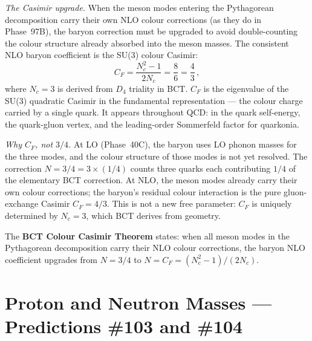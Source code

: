 \documentclass[10pt,twocolumn]{article}
\begin{document}
\textit{The Casimir upgrade.} When the meson modes entering the Pythagorean decomposition carry
their own NLO colour corrections (as they do in Phase~97B), the baryon correction must be
upgraded to avoid double-counting the colour structure already absorbed into the meson masses.
The consistent NLO baryon coefficient is the SU(3) colour Casimir:
\begin{equation}
C_F = \frac{N_c^2-1}{2N_c} = \frac{8}{6} = \frac{4}{3}\,,
\label{eq:CF}
\end{equation}
where $N_c = 3$ is derived from $D_4$ triality in BCT. $C_F$ is the eigenvalue of the SU(3)
quadratic Casimir in the fundamental representation --- the colour charge carried by a single
quark. It appears throughout QCD: in the quark self-energy, the quark-gluon vertex, and the
leading-order Sommerfeld factor for quarkonia.

\textit{Why $C_F$, not $3/4$.} At LO (Phase~40C), the baryon uses LO phonon masses for the
three modes, and the colour structure of those modes is not yet resolved. The correction
$N = 3/4 = 3\times(1/4)$ counts three quarks each contributing $1/4$ of the elementary BCT
correction. At NLO, the meson modes already carry their own colour corrections; the baryon's
residual colour interaction is the pure gluon-exchange Casimir $C_F = 4/3$. This is not a new
free parameter: $C_F$ is uniquely determined by $N_c = 3$, which BCT derives from geometry.

The \textbf{BCT Colour Casimir Theorem} states: when all meson modes in the Pythagorean
decomposition carry their NLO colour corrections, the baryon NLO coefficient upgrades from
$N = 3/4$ to $N = C_F = (N_c^2-1)/(2N_c)$.

\section{Proton and Neutron Masses --- Predictions \#103 and \#104}
\end{document}
